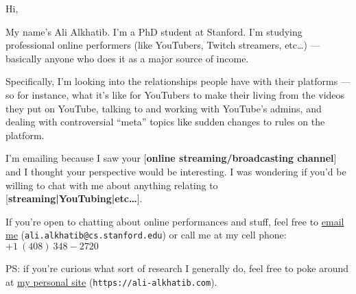 \documentclass[11pt]{article}
\begin{document}
Hi,

My name's Ali Alkhatib. %
I'm a PhD student at Stanford.
I'm studying professional online performers
(like YouTubers, Twitch streamers, etc\dots)
--- basically anyone who does it as a major source of income.

Specifically, I'm looking into
the relationships people have with their platforms
--- so for instance, what it's like for
YouTubers to make their living from the videos they put on YouTube,
talking to and working with YouTube's admins,
and dealing with controversial ``meta'' topics like
sudden changes to rules on the platform.

I'm emailing because I saw your
[\textbf{online streaming/broadcasting channel}]
and I thought your perspective would be interesting.
I was wondering if you'd be willing to chat with me about anything relating to
[\textbf{streaming|YouTubing|etc\dots}]. %


If you're open to chatting about online performances and stuff, feel free to
\href{mailto:ali.alkhatib@cs.stanford.edu}{email me}
(\texttt{ali\allowbreak .alkhatib\allowbreak @cs\allowbreak .stanford.edu}) or
call me at my cell phone: ${+1~(408)~348-2720}$

PS: if you're curious what sort of research I generally do,
feel free to poke around at \href{https://ali-alkhatib.com}{my personal site}
(\texttt{https://\allowbreak ali-\allowbreak alkhatib\allowbreak .com}).
\end{document}
